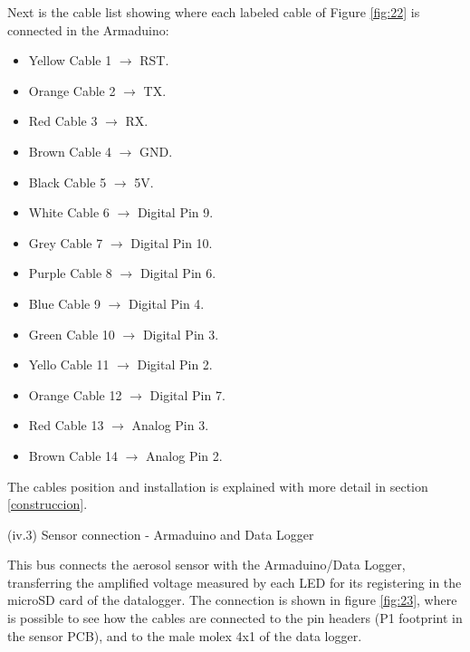\documentclass[12pt,letterpaper]{article}
\numberwithin{figure}{section}
\numberwithin{equation}{section}
\numberwithin{table}{section}
\begin{document}
Next is the cable list showing where each labeled cable of Figure \ref{fig:22} is connected in the Armaduino:

\begin{itemize}
    \item Yellow Cable 1 $\rightarrow$ RST.
    \item Orange Cable 2 $\rightarrow$ TX.
    \item Red Cable 3 $\rightarrow$ RX.
    \item Brown Cable 4 $\rightarrow$ GND.
    \item Black Cable 5 $\rightarrow$ 5V.
    \item White Cable 6 $\rightarrow$ Digital Pin 9.
    \item Grey Cable 7 $\rightarrow$ Digital Pin 10.
    \item Purple Cable 8 $\rightarrow$ Digital Pin 6.
    \item Blue Cable 9 $\rightarrow$ Digital Pin 4.
    \item Green Cable 10 $\rightarrow$ Digital Pin 3.
    \item Yello Cable 11 $\rightarrow$ Digital Pin 2.
    \item Orange Cable 12 $\rightarrow$ Digital Pin 7.
    \item Red Cable 13 $\rightarrow$ Analog Pin 3.
    \item Brown Cable 14 $\rightarrow$ Analog Pin 2.
\end{itemize}

The cables position and installation is explained with more detail in section \ref{construccion}.

\begin{flushleft}
(iv.3) Sensor connection - Armaduino and Data Logger
\end{flushleft}

This bus connects the aerosol sensor with the Armaduino/Data Logger, transferring the amplified voltage measured by each LED for its registering in the microSD card of the datalogger. The connection is shown in figure \ref{fig:23}, where is possible to see how the cables are connected to the pin headers (P1 footprint in the sensor PCB), and to the male molex 4x1 of the data logger.
\end{document}

